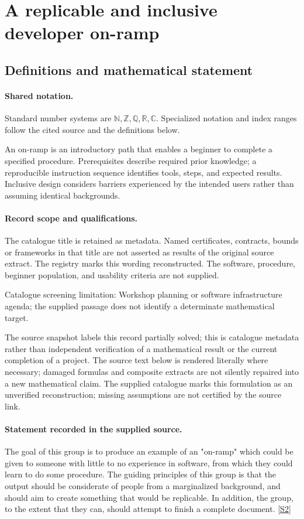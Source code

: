 \documentclass[11pt]{article}
\newcommand{\sref}[2]{\hyperlink{source:#1:#2}{[S#2]}}
\begin{document}
\section{A replicable and inclusive developer on-ramp}\label{statement}

\subsection{Definitions and mathematical statement}

\paragraph{Shared notation.}Standard number systems are $\mathbb N,\mathbb Z,\mathbb Q,\mathbb R,\mathbb C$. Specialized notation and index ranges follow the cited source and the definitions below.


An on-ramp is an introductory path that enables a beginner to complete a specified procedure. Prerequisites describe required prior knowledge; a reproducible instruction sequence identifies tools, steps, and expected results. Inclusive design considers barriers experienced by the intended users rather than assuming identical backgrounds.
\paragraph{Record scope and qualifications.}
The catalogue title is retained as metadata. Named certificates, contracts, bounds or frameworks in that title are not asserted as results of the original source extract.
The registry marks this wording reconstructed. The software, procedure, beginner population, and usability criteria are not supplied.

Catalogue screening limitation: Workshop planning or software infrastructure agenda; the supplied passage does not identify a determinate mathematical target.

The source snapshot labels this record partially solved; this is catalogue metadata rather than independent verification of a mathematical result or the current completion of a project.
The source text below is rendered literally where necessary; damaged formulas and composite extracts are not silently repaired into a new mathematical claim.
The supplied catalogue marks this formulation as an unverified reconstruction; missing assumptions are not certified by the source link.
\paragraph{Statement recorded in the supplied source.}
The goal of this group is to produce an example of an "on-ramp" which could be given to someone with little to no experience in software, from which they could learn to do some procedure. The guiding principles of this group is that the output should be considerate of people from a marginalized background, and should aim to create something that would be replicable. In addition, the group, to the extent that they can, should attempt to finish a complete document. \sref{statement}{2}
\end{document}
